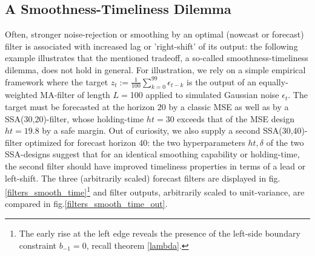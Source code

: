 \documentclass[a4paper]{article}
\begin{document}
\subsection{A Smoothness-Timeliness Dilemma}\label{time_smooth}

Often, stronger noise-rejection or smoothing by an optimal (nowcast or forecast) filter is associated with increased lag or 'right-shift' of its output: the following example illustrates that the mentioned tradeoff, a so-called smoothness-timeliness dilemma, does not hold in general. For illustration, we  rely on a simple empirical framework where the target $z_t:=\frac{1}{100}\sum_{k=0}^{99}\epsilon_{t-k}$ is the output of an equally-weighted MA-filter of length $L=$100 applied to simulated Gaussian noise $\epsilon_t$. The target must be forecasted at the horizon $20$ by a classic MSE as well as by a SSA(30,20)-filter, whose holding-time $ht=30$ exceeds that of the MSE design $ht=19.8$ by a safe margin. Out of curiosity, we also supply a second SSA(30,40)-filter optimized for forecast horizon 40: the two hyperparameters $ht,\delta$ of the two SSA-designs suggest that for an identical smoothing capability or holding-time, the second filter should have improved timeliness properties in terms of a lead or left-shift. The three (arbitrarily scaled) forecast filters are displayed in fig.\ref{filters_smooth_time}\footnote{The early rise at the left edge reveals the presence of the left-side boundary constraint $b_{-1}=0$, recall theorem \ref{lambda}.} and filter outputs, arbitrarily scaled to unit-variance, are compared in fig.\ref{filters_smooth_time_out}. 
\end{document}
